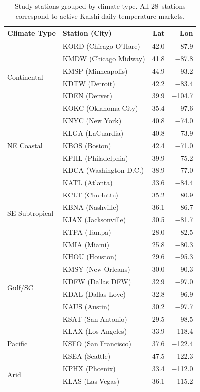 \documentclass[12pt, letterpaper]{article}
\begin{document}
\begin{table}[ht]
\centering
\caption{Study stations grouped by climate type. All 28~stations correspond to
active Kalshi daily temperature markets.}
\label{tab:stations}
\small
\begin{tabular}{llrr}
\toprule
Climate Type & Station (City) & Lat & Lon \\
\midrule
\multirow{6}{*}{Continental}
  & KORD (Chicago O'Hare) & 42.0 & $-$87.9 \\
  & KMDW (Chicago Midway) & 41.8 & $-$87.8 \\
  & KMSP (Minneapolis) & 44.9 & $-$93.2 \\
  & KDTW (Detroit) & 42.2 & $-$83.4 \\
  & KDEN (Denver) & 39.9 & $-$104.7 \\
  & KOKC (Oklahoma City) & 35.4 & $-$97.6 \\
\midrule
\multirow{5}{*}{NE Coastal}
  & KNYC (New York) & 40.8 & $-$74.0 \\
  & KLGA (LaGuardia) & 40.8 & $-$73.9 \\
  & KBOS (Boston) & 42.4 & $-$71.0 \\
  & KPHL (Philadelphia) & 39.9 & $-$75.2 \\
  & KDCA (Washington D.C.) & 38.9 & $-$77.0 \\
\midrule
\multirow{6}{*}{SE Subtropical}
  & KATL (Atlanta) & 33.6 & $-$84.4 \\
  & KCLT (Charlotte) & 35.2 & $-$80.9 \\
  & KBNA (Nashville) & 36.1 & $-$86.7 \\
  & KJAX (Jacksonville) & 30.5 & $-$81.7 \\
  & KTPA (Tampa) & 28.0 & $-$82.5 \\
  & KMIA (Miami) & 25.8 & $-$80.3 \\
\midrule
\multirow{6}{*}{Gulf/SC}
  & KHOU (Houston) & 29.6 & $-$95.3 \\
  & KMSY (New Orleans) & 30.0 & $-$90.3 \\
  & KDFW (Dallas DFW) & 32.9 & $-$97.0 \\
  & KDAL (Dallas Love) & 32.8 & $-$96.9 \\
  & KAUS (Austin) & 30.2 & $-$97.7 \\
  & KSAT (San Antonio) & 29.5 & $-$98.5 \\
\midrule
\multirow{3}{*}{Pacific}
  & KLAX (Los Angeles) & 33.9 & $-$118.4 \\
  & KSFO (San Francisco) & 37.6 & $-$122.4 \\
  & KSEA (Seattle) & 47.5 & $-$122.3 \\
\midrule
\multirow{2}{*}{Arid}
  & KPHX (Phoenix) & 33.4 & $-$112.0 \\
  & KLAS (Las Vegas) & 36.1 & $-$115.2 \\
\bottomrule
\end{tabular}
\end{table}
\end{document}
